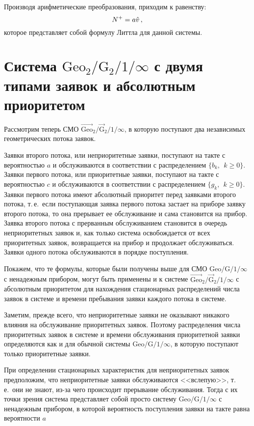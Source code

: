 \begin{multicols}{2}
Производя арифметические преобразования, приходим к равенству:
$$
N^+ = a \hat v\,,
$$
которое представляет собой формулу Литтла для данной системы.

\section{Система $\mbox{Geo}_2/\mbox{G}_2/1/\infty$ с двумя типами заявок
и абсолютным приоритетом}

Рассмотрим теперь СМО $\vec{\mbox{Geo}}_2/\vec {\mbox{G}}_2/1/\infty$, в
которую поступают два независимых геометрических потока
заявок.

Заявки второго потока, или неприоритетные заявки, поступают на такте
с вероятностью $a$ и обслуживаются в соответствии с распределением
$\{b_k,\ \ k\ge 0\}$. Заявки первого потока, или приоритетные
заявки, поступают на такте с вероятностью $c$ и обслуживаются в
соответствии с распределением $\{g_k,\ \ k\ge 0\}$. Заявки первого
потока имеют абсолютный приоритет перед заявками второго потока,
т.\,е.\ если поступающая заявка первого потока застает на приборе
заявку второго потока, то она прерывает ее обслуживание и сама
становится на прибор. Заявка второго потока с прерванным
обслуживанием становится в очередь неприоритетных заявок и, как
только система освобождается от всех приоритетных заявок,
возвращается на прибор и продолжает обслуживаться. Заявки одного
потока обслуживаются в порядке поступления.

Покажем, что те формулы, которые были получены
выше для СМО $\mbox{Geo}/\mbox{G}/1/\infty$ с ненадежным прибором,
могут быть применены и к сис\-те\-ме
$\vec{\mbox{Geo}}_{2}/\vec{\mbox{G}}_{2}/1/\infty$
с абсолютным приоритетом для нахождения стационарных
распределений чис\-ла заявок в сис\-те\-ме и времени пребывания
заявки каж\-до\-го потока в сис\-теме.

Заметим, прежде всего, что неприоритетные заявки не
оказывают никакого влияния на обслуживание приоритетных заявок.
Поэтому распределения числа приоритетных заявок в системе
и времени обслуживания приоритетной заявки определяются
как и для обычной системы $\mbox{Geo}/\mbox{G}/1/\infty$, в которую
поступают только приоритетные заявки.

При определении стационарных характеристик для неприоритетных заявок
предположим, что неприоритетные заявки обслуживаются <<вслепую>>,
т.\,е.\ они не знают, из-за чего происходит прерывание обслуживания.
Тогда с их точки зрения система представляет собой просто систему
$\mbox{Geo}/\mbox{G}/1/\infty$
 с ненадежным прибором, в которой вероятность
 поступления заявки на такте равна вероятности $a$\linebreak\vspace*{-12pt}


\end{multicols}
